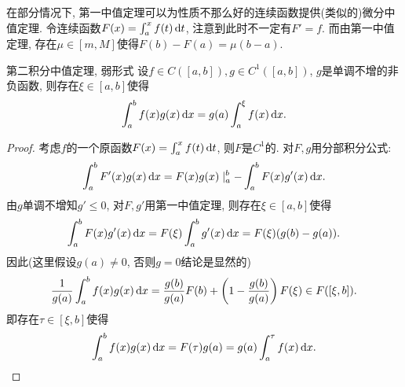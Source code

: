 在部分情况下, 第一中值定理可以为性质不那么好的连续函数提供(类似的)微分中值定理. 令连续函数$F(x)=\int_a^x f(t) \mathop{}\!\mathrm{d} t$, 注意到此时不一定有$F'=f$. 而由第一中值定理, 存在$\mu \in [m,M]$使得$F(b)-F(a) = \mu (b-a)$. 

\begin{lemma}{第二积分中值定理, 弱形式}
	设$f \in C([a,b]),g \in C^1([a,b])$, $g$是单调不增的非负函数, 则存在$\xi \in [a,b]$使得$$\int_a^b f(x) g(x) \mathop{}\!\mathrm{d} x = g(a) \int_a^{\xi} f(x) \mathop{}\!\mathrm{d} x.$$
\end{lemma}
\begin{proof}
	考虑$f$的一个原函数$F(x)=\int_a^x f(t) \mathop{}\!\mathrm{d} t$, 则$F$是$C^1$的. 对$F,g$用分部积分公式: $$\int_a^b F'(x)g(x) \mathop{}\!\mathrm{d} x = F(x)g(x)\mid _a^b - \int_a^b F(x)g'(x) \mathop{}\!\mathrm{d} x.$$
	由$g$单调不增知$g' \leq 0$, 对$F,g'$用第一中值定理, 则存在$\xi \in [a,b]$使得$$\int_a^b F(x)g'(x) \mathop{}\!\mathrm{d} x = F(\xi) \int_a^b g'(x) \mathop{}\!\mathrm{d} x = F(\xi)(g(b)-g(a)).$$
	因此(这里假设$g(a)\neq 0$, 否则$g=0$结论是显然的)$$\frac{1}{g(a)} \int_a^b f(x)g(x) \mathop{}\!\mathrm{d} x = \frac{g(b)}{g(a)}F(b)+\left( 1-\frac{g(b)}{g(a)} \right)F(\xi) \in F([\xi ,b]).$$
	即存在$\tau \in [\xi ,b]$使得$$\int_a^b f(x)g(x) \mathop{}\!\mathrm{d} x = F(\tau)g(a)= g(a) \int_a^{\tau} f(x) \mathop{}\!\mathrm{d} x.$$
\end{proof}

